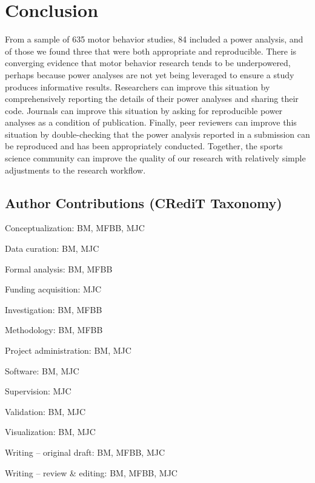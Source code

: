 \documentclass[
  man, donotrepeattitle,mask,floatsintext]{apa7}
\begin{document}
\hypertarget{conclusion}{%
\section{Conclusion}\label{conclusion}}

From a sample of 635 motor behavior studies, 84 included a power analysis, and of those we found three that were both appropriate and reproducible. There is converging evidence that motor behavior research tends to be underpowered, perhaps because power analyses are not yet being leveraged to ensure a study produces informative results. Researchers can improve this situation by comprehensively reporting the details of their power analyses and sharing their code. Journals can improve this situation by asking for reproducible power analyses as a condition of publication. Finally, peer reviewers can improve this situation by double-checking that the power analysis reported in a submission can be reproduced and has been appropriately conducted. Together, the sports science community can improve the quality of our research with relatively simple adjustments to the research workflow.

\vspace{5ex}

\hypertarget{author-contributions-credit-taxonomy}{%
\subsection{Author Contributions (CRediT Taxonomy)}\label{author-contributions-credit-taxonomy}}

\noindent Conceptualization: BM, MFBB, MJC

\noindent Data curation: BM, MJC

\noindent Formal analysis: BM, MFBB

\noindent Funding acquisition: MJC

\noindent Investigation: BM, MFBB

\noindent Methodology: BM, MFBB

\noindent Project administration: BM, MJC

\noindent Software: BM, MJC

\noindent Supervision: MJC

\noindent Validation: BM, MJC

\noindent Visualization: BM, MJC

\noindent Writing -- original draft: BM, MFBB, MJC

\noindent Writing -- review \& editing: BM, MFBB, MJC
\end{document}
